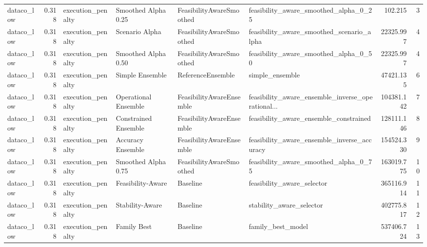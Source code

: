 \begin{table}
{\begin{tabular}{lrllllrr}
    dataco\_low &             0.318 &           execution\_penalty &   Smoothed Alpha 0.25 &  FeasibilityAwareSmoothed &              feasibility\_aware\_smoothed\_alpha\_0\_25 &       102.215 &               3 \\
    dataco\_low &             0.318 &           execution\_penalty &        Scenario Alpha &  FeasibilityAwareSmoothed &          feasibility\_aware\_smoothed\_scenario\_alpha &     22325.997 &               4 \\
    dataco\_low &             0.318 &           execution\_penalty &   Smoothed Alpha 0.50 &  FeasibilityAwareSmoothed &              feasibility\_aware\_smoothed\_alpha\_0\_50 &     22325.997 &               4 \\
    dataco\_low &             0.318 &           execution\_penalty &       Simple Ensemble &         ReferenceEnsemble &                                    simple\_ensemble &     47421.135 &               6 \\
    dataco\_low &             0.318 &           execution\_penalty &  Operational Ensemble &  FeasibilityAwareEnsemble &  feasibility\_aware\_ensemble\_inverse\_operational... &    104381.142 &               7 \\
    dataco\_low &             0.318 &           execution\_penalty &  Constrained Ensemble &  FeasibilityAwareEnsemble &             feasibility\_aware\_ensemble\_constrained &    128111.146 &               8 \\
    dataco\_low &             0.318 &           execution\_penalty &     Accuracy Ensemble &  FeasibilityAwareEnsemble &        feasibility\_aware\_ensemble\_inverse\_accuracy &    154524.330 &               9 \\
    dataco\_low &             0.318 &           execution\_penalty &   Smoothed Alpha 0.75 &  FeasibilityAwareSmoothed &              feasibility\_aware\_smoothed\_alpha\_0\_75 &    163019.775 &              10 \\
    dataco\_low &             0.318 &           execution\_penalty &     Feasibility-Aware &                  Baseline &                         feasibility\_aware\_selector &    365116.914 &              11 \\
    dataco\_low &             0.318 &           execution\_penalty &       Stability-Aware &                  Baseline &                           stability\_aware\_selector &    402775.817 &              12 \\
    dataco\_low &             0.318 &           execution\_penalty &           Family Best &                  Baseline &                                  family\_best\_model &    537406.724 &              13 \\

\end{tabular}}
\end{table}
